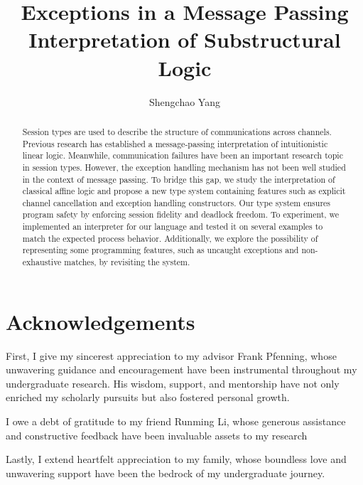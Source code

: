\documentclass[12pt, openany]{memoir}
\begin{document}
\frontmatter

\pagestyle{empty}

\title{\textbf{Exceptions in a Message Passing Interpretation of Substructural Logic}}
\author{Shengchao Yang}


\maketitle

\pagestyle{nonumbers}

\begin{abstract}
  Session types are used to describe the structure of communications across channels. Previous research has established a message-passing interpretation of intuitionistic linear logic. 
  Meanwhile, communication failures have been an important research topic in session types. 
  However, the exception handling mechanism has not been well studied in the context of message passing. 
  To bridge this gap, we study the interpretation of classical affine logic and propose a new type system containing features such as explicit channel cancellation and exception handling constructors. 
  Our type system ensures program safety by enforcing session fidelity and deadlock freedom. 
  To experiment, we implemented an interpreter for our language and tested it on several examples to match the expected process behavior. 
  Additionally, we explore the possibility of representing some programming features, such as uncaught exceptions and non-exhaustive matches, by revisiting the system.
\end{abstract}

\chapter{Acknowledgements}

First, I give my sincerest appreciation to my advisor Frank Pfenning, whose unwavering guidance and encouragement have been instrumental throughout my undergraduate research. 
His wisdom, support, and mentorship have not only enriched my scholarly pursuits but also fostered personal growth. 

I owe a debt of gratitude to my friend Runming Li, whose generous assistance and constructive feedback have been invaluable assets to my research

Lastly, I extend heartfelt appreciation to my family, whose boundless love and unwavering support have been the bedrock of my undergraduate journey. 
\cleardoublepage
\tableofcontents
\end{document}
